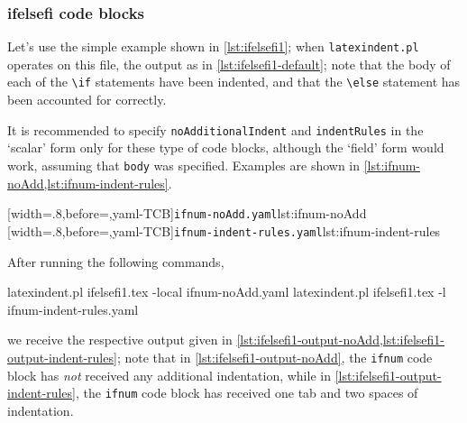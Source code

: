 \subsubsection{ifelsefi code blocks}
 \begin{example}
 Let's use the simple example shown in \cref{lst:ifelsefi1}; when \texttt{latexindent.pl}
 operates on this file, the output as in \cref{lst:ifelsefi1-default}; note that the body
 of each of the \lstinline!\if! statements have been indented, and that the
 \lstinline!\else! statement has been accounted for correctly.

 \begin{cmhtcbraster}
 \end{cmhtcbraster}

 It is recommended to specify \texttt{noAdditionalIndent} and \texttt{indentRules} in the
 `scalar' form only for these type of code blocks, although the `field' form would work,
 assuming that \texttt{body} was specified. Examples are shown in
 \cref{lst:ifnum-noAdd,lst:ifnum-indent-rules}.

 \begin{cmhtcbraster}
  [width=.8\linewidth,before=\centering,yaml-TCB]{\texttt{ifnum-noAdd.yaml}}{lst:ifnum-noAdd}
  [width=.8\linewidth,before=\centering,yaml-TCB]{\texttt{ifnum-indent-rules.yaml}}{lst:ifnum-indent-rules}
 \end{cmhtcbraster}

 After running the following commands, 

 \begin{commandshell}
latexindent.pl ifelsefi1.tex -local ifnum-noAdd.yaml  
latexindent.pl ifelsefi1.tex -l ifnum-indent-rules.yaml  
\end{commandshell}

 we receive the respective output given in
 \cref{lst:ifelsefi1-output-noAdd,lst:ifelsefi1-output-indent-rules}; note that in
 \cref{lst:ifelsefi1-output-noAdd}, the \texttt{ifnum} code block has \emph{not} received
 any additional indentation, while in \cref{lst:ifelsefi1-output-indent-rules}, the
 \texttt{ifnum} code block has received one tab and two spaces of indentation.

 \begin{cmhtcbraster}
 \end{cmhtcbraster}
 \end{example}


